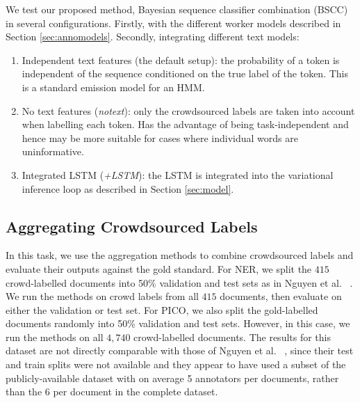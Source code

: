 We test our proposed method, Bayesian sequence classifier combination (BSCC) in several configurations. Firstly, with the different worker models described in Section \ref{sec:annomodels}.
Secondly, integrating different text models:
\begin{enumerate}
\item Independent text features (the default setup): the probability of a token is independent of the sequence conditioned on the true label of the token. This is a standard emission model for an HMM.
\item No text features (\emph{notext}): only the crowdsourced labels are taken into account when labelling each token. Has the advantage of being task-independent and hence may be more suitable for cases where individual words are uninformative.
\item Integrated LSTM (\emph{+LSTM}): the LSTM is integrated into the variational inference loop as described in Section \ref{sec:model}.
\end{enumerate}

\subsection{Aggregating Crowdsourced Labels}\label{sec:task1}

In this task, we use the aggregation methods to combine crowdsourced labels and evaluate their outputs against the gold standard.
For NER, we split the $415$ crowd-labelled documents into 50\% validation and test sets as in Nguyen et al. ~. We run the methods on crowd labels from all $415$ documents, then evaluate on either the
validation or test set.
For PICO, we also split the gold-labelled documents randomly into 50\% validation and test sets. However, in this case, we run the methods on all $4,740$ crowd-labelled documents. The results for this dataset are not directly comparable
with those of Nguyen et al. ~, since their test and train splits were not available 
and they appear to have used a subset of the publicly-available dataset with on average 5 annotators per documents, rather than the 6 per document in the complete dataset.

